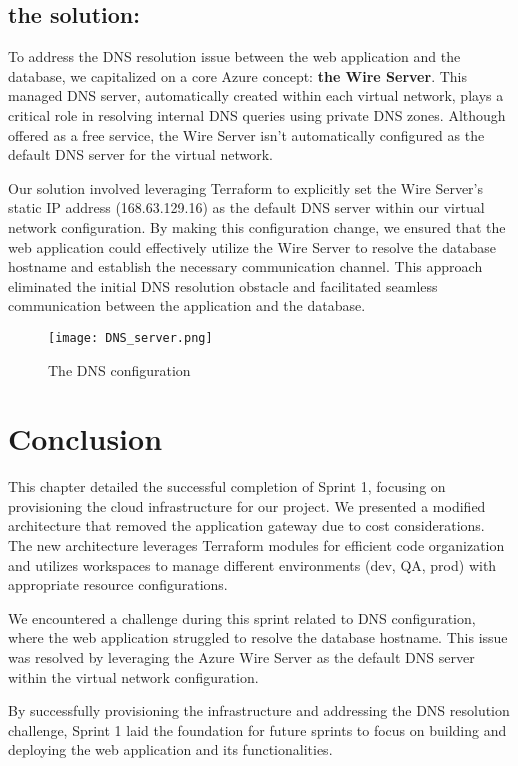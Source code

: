 \subsection*{the solution:}
To address the DNS resolution issue between the web application and the database, we capitalized on a core Azure concept: \textbf{the Wire Server}. This managed DNS server, automatically created within each virtual network, plays a critical role in resolving internal DNS queries using private DNS zones. Although offered as a free service, the Wire Server isn't automatically configured as the default DNS server for the virtual network.

Our solution involved leveraging Terraform to explicitly set the Wire Server's static IP address (168.63.129.16) as the default DNS server within our virtual network configuration. By making this configuration change, we ensured that the web application could effectively utilize the Wire Server to resolve the database hostname and establish the necessary communication channel. This approach eliminated the initial DNS resolution obstacle and facilitated seamless communication between the application and the database.

\begin{figure}[htpb]
    \centering
    \texttt{[image: DNS\_server.png]}
    \caption{The DNS configuration}
    \label{fig:dns_configuration}
\end{figure}

\section{Conclusion}
This chapter detailed the successful completion of Sprint 1, focusing on provisioning the cloud infrastructure for our project. We  presented a modified architecture that removed the application gateway due to cost considerations. The new architecture leverages Terraform modules for efficient code organization and utilizes workspaces to manage different environments (dev, QA, prod) with appropriate resource configurations.
\par
We encountered a challenge during this sprint related to DNS configuration, where the web application struggled to resolve the database hostname. This issue was resolved by leveraging the Azure Wire Server as the default DNS server within the virtual network configuration.
\par
By successfully provisioning the infrastructure and addressing the DNS resolution challenge, Sprint 1 laid the foundation for future sprints to focus on building and deploying the web application and its functionalities.
